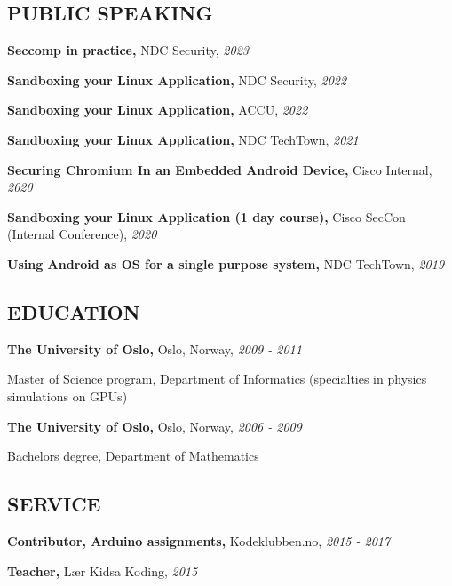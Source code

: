 \documentclass{article}
\newcommand\CVEntry[3]{
  {\bf #1,} #2, {\it #3}
}
\newcommand\CVComment[4]{
  \CVEntry{#1}{#2}{#3}

  #4
}
\begin{document}
\subsection*{PUBLIC SPEAKING}

\begin{addmargin}[2em]{0em}
  \CVEntry{Seccomp in practice}{NDC Security}{2023}

  \CVEntry{Sandboxing your Linux Application}{NDC Security}{2022}

  \CVEntry{Sandboxing your Linux Application}{ACCU}{2022}

  \CVEntry{Sandboxing your Linux Application}{NDC TechTown}{2021}

  \CVEntry{Securing Chromium In an Embedded Android Device}{Cisco Internal}{2020}

  \CVEntry{Sandboxing your Linux Application (1 day course)}{Cisco SecCon (Internal Conference)}{2020}

  \CVEntry{Using Android as OS for a single purpose system}{NDC TechTown}{2019}
\end{addmargin}


\subsection*{EDUCATION}

\begin{addmargin}[2em]{0em}
  \CVComment{The University of Oslo}{Oslo, Norway}{2009 - 2011}{
    Master of Science program, Department of Informatics (specialties in physics simulations on GPUs)}

  \CVComment{The University of Oslo}{Oslo, Norway}{2006 - 2009}{
    Bachelors degree, Department of Mathematics}
\end{addmargin}

\subsection*{SERVICE}

\begin{addmargin}[2em]{0em}
  \CVEntry{Contributor, Arduino assignments}{Kodeklubben.no}{2015 - 2017}

  \CVEntry{Teacher}{L\ae r Kidsa Koding}{2015}
\end{addmargin}
\end{document}
